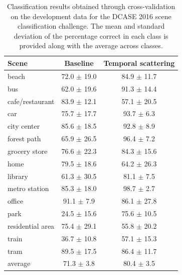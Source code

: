 \documentclass{article}
\begin{document}
\begin{sloppy}
\begin{table}[!htbp]
\centering
\begin{tabular}{lcc}
\toprule
Scene & Baseline & Temporal scattering \\
\midrule
beach & 72.0 $\pm$ 19.0 & 84.9 $\pm$ 11.7 \\

bus & 62.0 $\pm$ 19.6 & 91.3 $\pm$ 14.4 \\

cafe/restaurant & 83.9 $\pm$ 12.1 & 57.1 $\pm$ 20.5 \\

car & 75.7 $\pm$ 17.7 & 93.7 $\pm$  \phantom{0}6.3 \\

city center & 85.6 $\pm$ 18.5 & 92.8 $\pm$  \phantom{0}8.9 \\

forest path & 65.9 $\pm$ 26.5 & 96.4 $\pm$  \phantom{0}7.2 \\

grocery store & 76.6 $\pm$ 22.3 & 84.3 $\pm$ 15.6 \\

home & 79.5 $\pm$ 18.6 & 64.2 $\pm$ 26.3 \\

library & 61.3 $\pm$ 30.5 & 81.1 $\pm$  \phantom{0}7.5 \\

metro station & 85.3 $\pm$ 18.0 & 98.7 $\pm$  \phantom{0}2.7 \\

office & 91.1 $\pm$ \phantom{0}7.9 & 86.1 $\pm$ 27.8 \\

park & 24.5 $\pm$ 15.6 & 75.6 $\pm$ 10.5 \\

residential area & 75.4 $\pm$ 29.1 & 55.8 $\pm$ 20.2 \\

train & 36.7 $\pm$ 10.8 & 57.1 $\pm$ 15.3 \\

tram & 89.5 $\pm$ 17.5 & 86.4 $\pm$ 11.7 \\

\bottomrule

average & 71.3 $\pm$  \phantom{0}3.8 & 80.4 $\pm$  \phantom{0}3.5
\end{tabular}
\caption{\label{table:development-results} Classification results obtained through cross-validation on the development data for the DCASE 2016 scene classification challenge. The mean and standard deviation of the percentage correct in each class is provided along with the average across classes.}
\end{table}




\end{sloppy}
\end{document}

